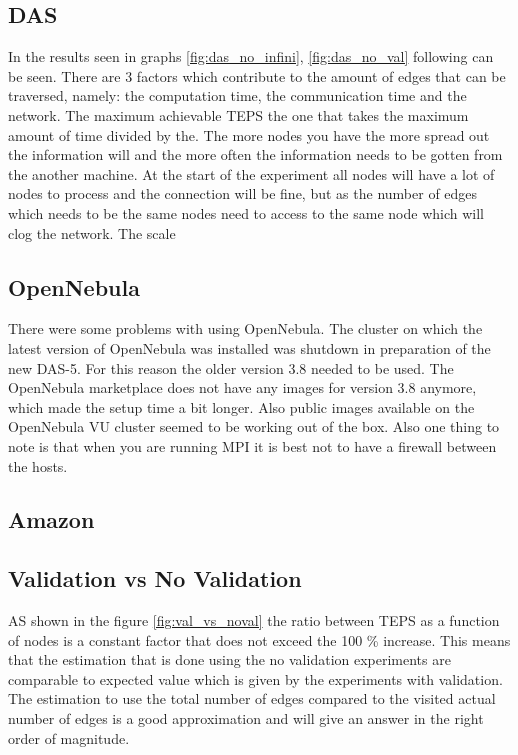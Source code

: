 \subsection{DAS}
In the results seen in graphs \ref{fig:das_no_infini}, \ref{fig:das_no_val} following can be seen. There are 3 factors which contribute to the amount of edges that can be traversed, namely: the computation time, the communication time and the network. The maximum achievable TEPS the one that takes the maximum amount of time divided by the. The more nodes you have the more spread out the information will and the more often the information needs to be gotten from the another machine. At the start of the experiment all nodes will have a lot of nodes to process and the connection will be fine, but as the number of edges which needs to be the same nodes need to access to the same node which will clog the network.
The scale 


\subsection{OpenNebula}
There were some problems with using OpenNebula. The cluster on which the latest version of OpenNebula was installed was shutdown in preparation of the new DAS-5. For this reason the older version 3.8 needed to be used. The OpenNebula marketplace does not have any images for version 3.8 anymore, which made the setup time a bit longer. Also public images available on the OpenNebula VU cluster seemed to be working out of the box. Also one thing to note is that when you are running MPI it is best not to have a firewall between the hosts. 

\subsection{Amazon}

\subsection{Validation vs No Validation}
AS shown in the figure \ref{fig:val_vs_noval} the ratio between TEPS as a function of nodes is a constant factor that does not exceed the 100 \% increase. This means that the estimation that is done using the no validation experiments are comparable to expected value which is given by the experiments with validation. The estimation to use the total number of edges compared to the visited actual number of edges is a good approximation and will give an answer in the right order of magnitude. 

